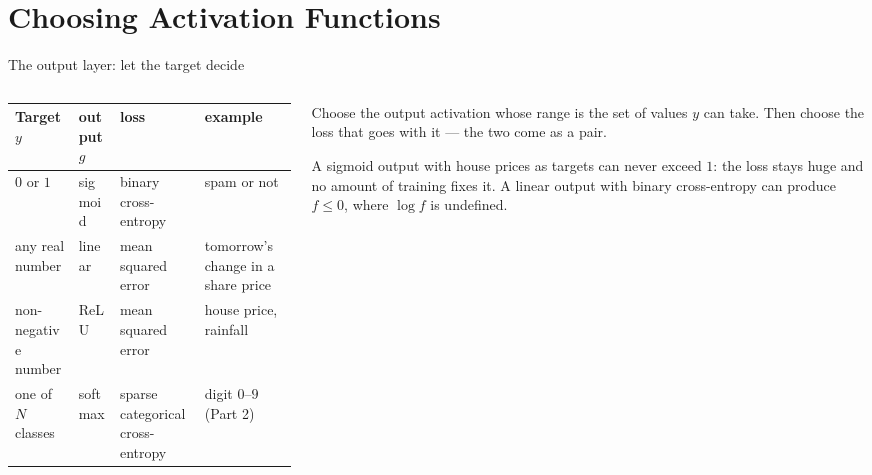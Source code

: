 \documentclass[aspectratio=169,10pt]{beamer}
\begin{document}
\section{Choosing Activation Functions}

\begin{frame}{The output layer: let the target decide}
  \begin{columns}[T,onlytextwidth]
    \begin{column}{0.56\textwidth}
      \footnotesize
      \renewcommand{\arraystretch}{1.35}
      \begin{tabular}{@{}L{2.0cm}L{1.3cm}L{2.0cm}L{1.8cm}@{}}
        \toprule
        Target $y$ & output $g$ & loss & example\\
        \midrule
        $0$ or $1$ & sigmoid & binary cross-entropy & spam or not\\
        any real number & linear & mean squared error & tomorrow's change in a share price\\
        non-negative number & ReLU & mean squared error & house price, rainfall\\
        one of $N$ classes & softmax & sparse categorical cross-entropy & digit $0$--$9$ (Part 2)\\
        \bottomrule
      \end{tabular}
    \end{column}
    \begin{column}{0.4\textwidth}
      \begin{keyidea}
        Choose the output activation whose range is the set of values $y$ can take. Then
        choose the loss that goes with it --- the two come as a pair.
      \end{keyidea}
      \begin{pitfall}[Mismatch]
        \footnotesize A sigmoid output with house prices as targets can never exceed $1$:
        the loss stays huge and no amount of training fixes it. A linear output with
        binary cross-entropy can produce $f\le0$, where $\log f$ is undefined.
      \end{pitfall}
    \end{column}
  \end{columns}
\end{frame}
\end{document}
